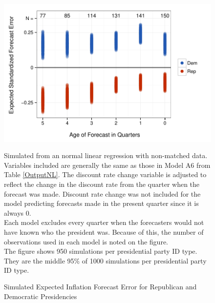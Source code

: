 \documentclass[a4paper]{article}\usepackage{graphicx, color}
\newenvironment{knitrout}{}{} %
\begin{document}
\begin{figure}[t]
    \caption{Simulated Expected Inflation Forecast Error for Republican and Democratic Presidencies}
    \label{ExpectValueParty}
    \begin{center}

\begin{knitrout}
\color{fgcolor}

{\centering \includegraphics[width=0.81\linewidth]{figure/ExpectValueParty} 

}



\end{knitrout}





    \end{center}
    \begin{singlespace}
        {\scriptsize{Simulated from an normal linear regression with non-matched data. Variables included are generally the same as those in Model A6 from Table \ref{OutputNL}. The discount rate change variable is adjusted to reflect the change in the discount rate from the quarter when the forecast was made. Discount rate change was not included for the model predicting forecasts made in the present quarter since it is always 0. \\ Each model excludes every quarter when the forecasters would not have known who the president was. Because of this, the number of observations used in each model is noted on the figure. \\ The figure shows 950 simulations per presidential party ID type. They are the middle 95\% of 1000 simulations per presidential party ID type.}}
    \end{singlespace}
\end{figure}
\end{document}
